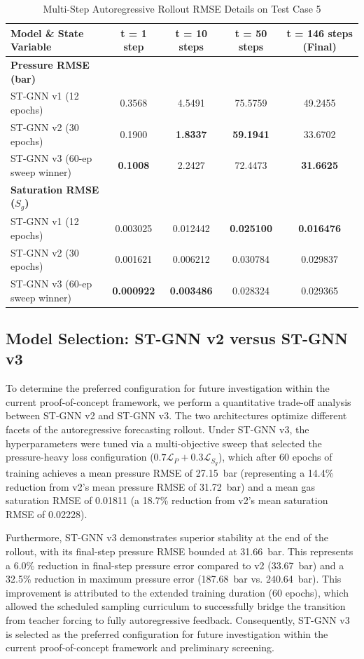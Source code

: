 \begin{table}[h]
\centering
\caption{Multi-Step Autoregressive Rollout RMSE Details on Test Case 5}
\label{tab:rollout_metrics}
\begin{tabular}{lcccc}
\toprule
\textbf{Model \& State Variable} & \textbf{t = 1 step} & \textbf{t = 10 steps} & \textbf{t = 50 steps} & \textbf{t = 146 steps (Final)} \\
\midrule
\textbf{Pressure RMSE (bar)} \\
ST-GNN v1 (12 epochs) & 0.3568 & 4.5491 & 75.5759 & 49.2455 \\
ST-GNN v2 (30 epochs) & 0.1900 & \textbf{1.8337} & \textbf{59.1941} & 33.6702 \\
ST-GNN v3 (60-ep sweep winner) & \textbf{0.1008} & 2.2427 & 72.4473 & \textbf{31.6625} \\
\midrule
\textbf{Saturation RMSE ($S_g$)} \\
ST-GNN v1 (12 epochs) & 0.003025 & 0.012442 & \textbf{0.025100} & \textbf{0.016476} \\
ST-GNN v2 (30 epochs) & 0.001621 & 0.006212 & 0.030784 & 0.029837 \\
ST-GNN v3 (60-ep sweep winner) & \textbf{0.000922} & \textbf{0.003486} & 0.028324 & 0.029365 \\
\bottomrule
\end{tabular}
\end{table}

\subsection{Model Selection: ST-GNN v2 versus ST-GNN v3}
To determine the preferred configuration for future investigation within the current proof-of-concept framework, we perform a quantitative trade-off analysis between ST-GNN v2 and ST-GNN v3. The two architectures optimize different facets of the autoregressive forecasting rollout. Under ST-GNN v3, the hyperparameters were tuned via a multi-objective sweep that selected the pressure-heavy loss configuration ($0.7\mathcal{L}_P + 0.3\mathcal{L}_{S_g}$), which after 60 epochs of training achieves a mean pressure RMSE of 27.15~bar (representing a 14.4\% reduction from v2's mean pressure RMSE of 31.72~bar) and a mean gas saturation RMSE of 0.01811 (a 18.7\% reduction from v2's mean saturation RMSE of 0.02228). 

Furthermore, ST-GNN v3 demonstrates superior stability at the end of the rollout, with its final-step pressure RMSE bounded at 31.66~bar. This represents a 6.0\% reduction in final-step pressure error compared to v2 (33.67~bar) and a 32.5\% reduction in maximum pressure error (187.68~bar vs. 240.64~bar). This improvement is attributed to the extended training duration (60 epochs), which allowed the scheduled sampling curriculum to successfully bridge the transition from teacher forcing to fully autoregressive feedback. Consequently, ST-GNN v3 is selected as the preferred configuration for future investigation within the current proof-of-concept framework and preliminary screening.

